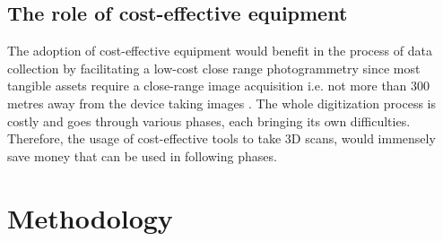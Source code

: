 \documentclass[a4paper, 12pt]{article}
\begin{document}

\subsection{\textbf{The role of cost-effective equipment}}
The adoption of cost-effective equipment would benefit in the process of data collection by facilitating a low-cost close range photogrammetry since most tangible assets require a close-range image acquisition i.e. not more than 300 metres away from the device taking images \cite{cls_ran}. The whole digitization process is costly and goes through various phases, each bringing its own difficulties. Therefore, the usage of cost-effective tools to take 3D scans, would immensely save money that can be used in following phases.

\section{\textbf{Methodology}}
\end{document}
